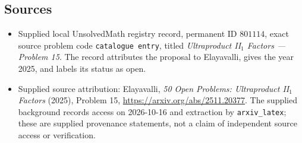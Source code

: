 \documentclass[11pt]{article}
\begin{document}
\subsection{Sources}
\begin{itemize}
\item Supplied local UnsolvedMath registry record, permanent ID \(801114\), exact source problem code \texttt{catalogue entry}, titled \emph{Ultraproduct II\( {}_1 \) Factors --- Problem 15}. The record attributes the proposal to Elayavalli, gives the year 2025, and labels its status as open.
\item Supplied source attribution: Elayavalli, \emph{50 Open Problems: Ultraproduct II\( {}_1 \) Factors} (2025), Problem 15, \url{https://arxiv.org/abs/2511.20377}. The supplied background records access on 2026-10-16 and extraction by \texttt{arxiv\_latex}; these are supplied provenance statements, not a claim of independent source access or verification.
\end{itemize}
\end{document}
